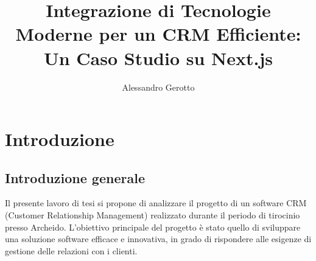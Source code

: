 \documentclass[target=bach,aauheader=,style=]{thud}
\title{Integrazione di Tecnologie Moderne per un CRM Efficiente: Un Caso Studio su Next.js}
\author{Alessandro Gerotto}
\begin{document}
\maketitle



\tableofcontents



\mainmatter

\chapter{Introduzione}
\section{Introduzione generale}
Il presente lavoro di tesi si propone di analizzare il progetto di un software CRM (Customer Relationship Management) realizzato durante il periodo di tirocinio presso Archeido. L'obiettivo principale del progetto è stato quello di sviluppare una soluzione software efficace e innovativa, in grado di rispondere alle esigenze di gestione delle relazioni con i clienti. 
\end{document}
